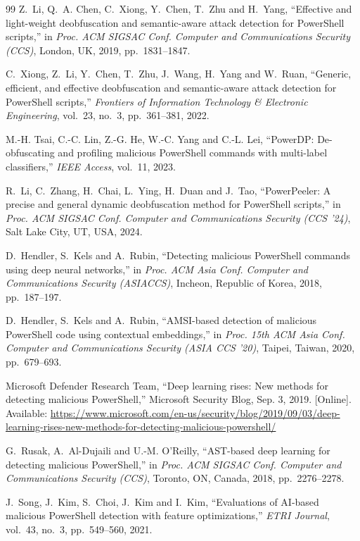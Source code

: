\documentclass[12pt,a4paper]{article}
\begin{document}
\begin{thebibliography}{99}
 Z.~Li, Q.~A. Chen, C.~Xiong, Y.~Chen, T.~Zhu and H.~Yang, ``Effective and light-weight deobfuscation and semantic-aware attack detection for PowerShell scripts,'' in \emph{Proc. ACM SIGSAC Conf. Computer and Communications Security (CCS)}, London, UK, 2019, pp.~1831--1847.

 C.~Xiong, Z.~Li, Y.~Chen, T.~Zhu, J.~Wang, H.~Yang and W.~Ruan, ``Generic, efficient, and effective deobfuscation and semantic-aware attack detection for PowerShell scripts,'' \emph{Frontiers of Information Technology \& Electronic Engineering}, vol.~23, no.~3, pp.~361--381, 2022.

 M.-H. Tsai, C.-C. Lin, Z.-G. He, W.-C. Yang and C.-L. Lei, ``PowerDP: De-obfuscating and profiling malicious PowerShell commands with multi-label classifiers,'' \emph{IEEE Access}, vol.~11, 2023.

 R.~Li, C.~Zhang, H.~Chai, L.~Ying, H.~Duan and J.~Tao, ``PowerPeeler: A precise and general dynamic deobfuscation method for PowerShell scripts,'' in \emph{Proc. ACM SIGSAC Conf. Computer and Communications Security (CCS '24)}, Salt Lake City, UT, USA, 2024.

 D.~Hendler, S.~Kels and A.~Rubin, ``Detecting malicious PowerShell commands using deep neural networks,'' in \emph{Proc. ACM Asia Conf. Computer and Communications Security (ASIACCS)}, Incheon, Republic of Korea, 2018, pp.~187--197.

 D.~Hendler, S.~Kels and A.~Rubin, ``AMSI-based detection of malicious PowerShell code using contextual embeddings,'' in \emph{Proc. 15th ACM Asia Conf. Computer and Communications Security (ASIA CCS '20)}, Taipei, Taiwan, 2020, pp.~679--693.

 Microsoft Defender Research Team, ``Deep learning rises: New methods for detecting malicious PowerShell,'' Microsoft Security Blog, Sep. 3, 2019. [Online]. Available: \url{https://www.microsoft.com/en-us/security/blog/2019/09/03/deep-learning-rises-new-methods-for-detecting-malicious-powershell/}

 G.~Rusak, A.~Al-Dujaili and U.-M. O'Reilly, ``AST-based deep learning for detecting malicious PowerShell,'' in \emph{Proc. ACM SIGSAC Conf. Computer and Communications Security (CCS)}, Toronto, ON, Canada, 2018, pp.~2276--2278.

 J.~Song, J.~Kim, S.~Choi, J.~Kim and I.~Kim, ``Evaluations of AI-based malicious PowerShell detection with feature optimizations,'' \emph{ETRI Journal}, vol.~43, no.~3, pp.~549--560, 2021.


\end{thebibliography}
\end{document}
